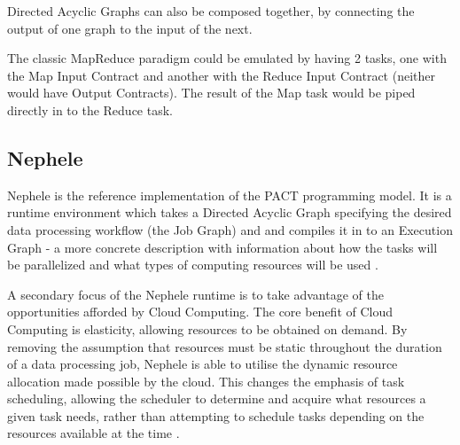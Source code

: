 Directed Acyclic Graphs can also be composed together, by connecting the output of one graph to the input of the next.

The classic MapReduce paradigm could be emulated by having 2 tasks, one with the Map Input Contract and another with the Reduce Input Contract (neither would have Output Contracts). The result of the Map task would be piped directly in to the Reduce task. 

\subsection{Nephele}
Nephele is the reference implementation of the PACT programming model. It is a runtime environment which takes a Directed Acyclic Graph specifying the desired data processing workflow (the Job Graph) and and compiles it in to an Execution Graph - a more concrete description with information about how the tasks will be parallelized and what types of computing resources will be used \cite{warneke2011exploiting}. 

A secondary focus of the Nephele runtime is to take advantage of the opportunities afforded by Cloud Computing. The core benefit of Cloud Computing is elasticity, allowing resources to be obtained on demand. By removing the assumption that resources must be static throughout the duration of a data processing job, Nephele is able to utilise the dynamic resource allocation made possible by the cloud. This changes the emphasis of task scheduling, allowing the scheduler to determine and acquire what resources a given task needs, rather than attempting to schedule tasks depending on the resources available at the time \cite{warneke2011exploiting}.




